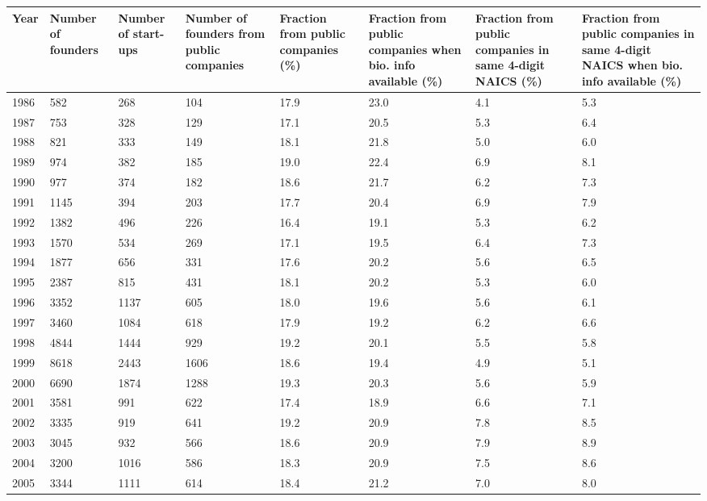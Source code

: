 \begin{table}[!htb]
\centering
\begingroup\scriptsize
\begin{tabular}{p{1.75cm}p{1.75cm}p{1.75cm}p{1.75cm}p{1.75cm}p{1.75cm}p{1.75cm}p{1.75cm}}
  \toprule
Year & Number of founders & Number of start-ups & Number of founders from public companies & Fraction from public companies (\%) & Fraction from public companies when bio. info available (\%) & Fraction from public companies in same 4-digit NAICS (\%) & Fraction from public companies in same 4-digit NAICS when bio. info available (\%) \\ 
  \midrule
1986 & 582 & 268 & 104 & 17.9 & 23.0 & 4.1 & 5.3 \\ 
  1987 & 753 & 328 & 129 & 17.1 & 20.5 & 5.3 & 6.4 \\ 
  1988 & 821 & 333 & 149 & 18.1 & 21.8 & 5.0 & 6.0 \\ 
  1989 & 974 & 382 & 185 & 19.0 & 22.4 & 6.9 & 8.1 \\ 
  1990 & 977 & 374 & 182 & 18.6 & 21.7 & 6.2 & 7.3 \\ 
  1991 & 1145 & 394 & 203 & 17.7 & 20.4 & 6.9 & 7.9 \\ 
  1992 & 1382 & 496 & 226 & 16.4 & 19.1 & 5.3 & 6.2 \\ 
  1993 & 1570 & 534 & 269 & 17.1 & 19.5 & 6.4 & 7.3 \\ 
  1994 & 1877 & 656 & 331 & 17.6 & 20.2 & 5.6 & 6.5 \\ 
  1995 & 2387 & 815 & 431 & 18.1 & 20.2 & 5.3 & 6.0 \\ 
  1996 & 3352 & 1137 & 605 & 18.0 & 19.6 & 5.6 & 6.1 \\ 
  1997 & 3460 & 1084 & 618 & 17.9 & 19.2 & 6.2 & 6.6 \\ 
  1998 & 4844 & 1444 & 929 & 19.2 & 20.1 & 5.5 & 5.8 \\ 
  1999 & 8618 & 2443 & 1606 & 18.6 & 19.4 & 4.9 & 5.1 \\ 
  2000 & 6690 & 1874 & 1288 & 19.3 & 20.3 & 5.6 & 5.9 \\ 
  2001 & 3581 & 991 & 622 & 17.4 & 18.9 & 6.6 & 7.1 \\ 
  2002 & 3335 & 919 & 641 & 19.2 & 20.9 & 7.8 & 8.5 \\ 
  2003 & 3045 & 932 & 566 & 18.6 & 20.9 & 7.9 & 8.9 \\ 
  2004 & 3200 & 1016 & 586 & 18.3 & 20.9 & 7.5 & 8.6 \\ 
  2005 & 3344 & 1111 & 614 & 18.4 & 21.2 & 7.0 & 8.0 \\ 

\end{tabular}
\end{table}
